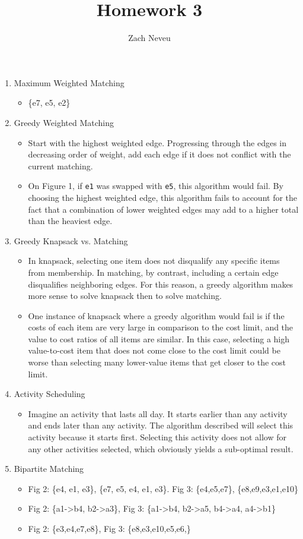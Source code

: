 \documentclass[12pt, letter]{article}
\author{Zach Neveu}
\title{ Homework 3 }
\begin{document}
\maketitle
\begin{enumerate}
	\item Maximum Weighted Matching
	\begin{itemize}
		\item \{e7, e5, e2\}
	\end{itemize}
	\item Greedy Weighted Matching
	\begin{itemize}
		\item Start with the highest weighted edge. Progressing through the edges in decreasing order of weight, add each edge if it does not conflict with the current matching.
		\item On Figure 1, if \texttt{e1} was swapped with \texttt{e5}, this algorithm would fail. By choosing the highest weighted edge, this algorithm fails to account for the fact that a combination of lower weighted edges may add to a higher total than the heaviest edge.
	\end{itemize}
	\item Greedy Knapsack vs. Matching
	\begin{itemize}
		\item In knapsack, selecting one item does not disqualify any specific items from membership. In matching, by contrast, including a certain edge disqualifies neighboring edges. For this reason, a greedy algorithm makes more sense to solve knapsack then to solve matching.
		\item One instance of knapsack where a greedy algorithm would fail is if the costs of each item are very large in comparison to the cost limit, and the value to cost ratios of all items are similar. In this case, selecting a high value-to-cost item that does not come close to the cost limit could be worse than selecting many lower-value items that get closer to the cost limit.
	\end{itemize}
	\item Activity Scheduling
	\begin{itemize}
		\item Imagine an activity that lasts all day. It starts earlier than any activity and ends later than any activity. The algorithm described will select this activity because it starts first. Selecting this activity does not allow for any other activities selected, which obviously yields a sub-optimal result.
	\end{itemize}
	\item Bipartite Matching
	\begin{itemize}
		\item Fig 2: \{e4, e1, e3\}, \{e7, e5, e4, e1, e3\}. Fig 3: \{e4,e5,e7\}, \{e8,e9,e3,e1,e10\}
		\item Fig 2: \{a1->b4, b2->a3\}, Fig 3: \{a1->b4, b2->a5, b4->a4, a4->b1\}
		\item Fig 2: \{e3,e4,e7,e8\}, Fig 3: \{e8,e3,e10,e5,e6,\}
	\end{itemize}
\end{enumerate}
\end{document}
